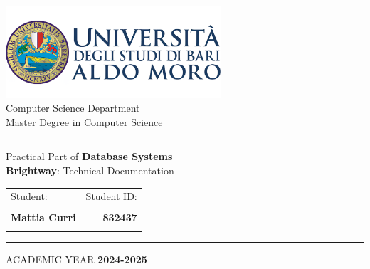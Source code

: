 
\begin{titlepage}
    \begin{center}
        \includegraphics[width=0.6\textwidth]{img/uniba_logo.png}\\
          \vspace{1cm}
          {\large Computer Science Department}\\
          \vspace{1cm}
          {\large Master Degree in Computer Science}\\
          \vspace{1cm}
          \hrule 
          \vspace{1.5cm}
          \vspace{0.5cm}
          {\large Practical Part of \textbf{Database Systems}}\\
          \vspace{1.5cm}
          {\LARGE \textbf{Brightway}: Technical Documentation}
          \\ %
          \vspace{1.2cm}

          \vfill
          
          \begin{tabularx}{\textwidth}{@{}Xr@{}}
            {\large Student:} & {\large Student ID:} \\  \\
            {\large \textbf{Mattia Curri}} & {\large \textbf{832437}} \\ \\
          \end{tabularx}
            
          \vspace{1cm}
          \hrule
          \vspace{1cm}
          {\large ACADEMIC YEAR \textbf{2024{-}2025}}
    \end{center}
\end{titlepage}